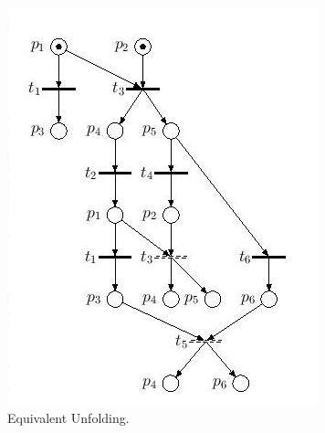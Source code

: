 \documentclass{beamer}
\begin{document}
\begin{frame}
\begin{columns}[c]
\begin{figure}
\includegraphics[width=1.1\linewidth,height=\textheight,keepaspectratio]{loic_unfolding.jpg}
\caption{Equivalent Unfolding.}
\end{figure}

\end{columns}
\end{frame}

\begin{frame}

\end{frame}
\end{document}
